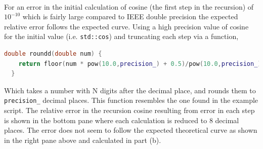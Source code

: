 \documentclass[singlepage,notitlepage,nofootinbib,11pt]{revtex4-1}
\begin{document}
\\
For an error in the initial calculation of cosine (the first step in the recursion) of $10^{-10}$ which is fairly large compared to IEEE double precision the expected relative error follows the expected curve. Using a high precision value of cosine for the initial value (i.e. \verb|std::cos|) and truncating each step via a function,
\begin{lstlisting}[language=C++]
  double roundd(double num) {
    return floor(num * pow(10.0,precision_) + 0.5)/pow(10.0,precision_);
  }
\end{lstlisting}
Which takes a number with N digits after the decimal place, and rounds them to \verb|precision_| decimal places. This function resembles the one found in the example script. The relative error in the recursion cosine resulting from error in each step is shown in the bottom pane where each calculation is reduced to 8 decimal places. The error does not seem to follow the expected theoretical curve as shown in the right pane above and calculated in part (b).
\end{document}
